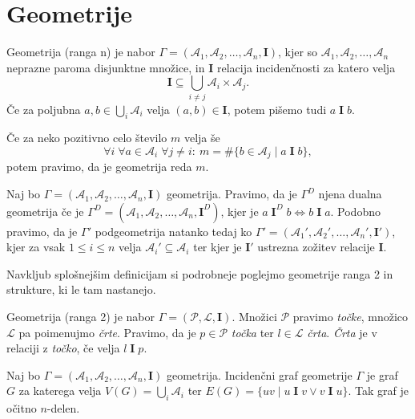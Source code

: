\documentclass[fin1, tisk]{fmfdelo}
\newcommand{\A}{\mathcal{A}}
\newcommand{\II}{\mathbf{I}}
\newcommand{\IIw}[2]{#1 \;\II\; #2}
\newcommand{\IIwd}[2]{#1 \;\II^D\; #2}
\newcommand{\PP}{\mathcal{P}}
\newcommand{\LL}{\mathcal{L}}
\begin{document}
\section{Geometrije}
\begin{definicija}
Geometrija (ranga n) je nabor
$\Gamma = \left(
    \A_1, \A_2, \ldots, \A_n, \II
\right)$, kjer so $\A_1, \A_2, \ldots, \A_n$ neprazne paroma disjunktne 
množice, in $\II$ relacija incidenčnosti za katero velja 
\[\II \subseteq \bigcup_{i\neq j} \A_i \times \A_j.\] Če za poljubna
$a, b \in \bigcup_{i} \A_i$ velja $(a, b) \in \II$, potem pišemo tudi
$\IIw{a}{b}$. 

Če za neko pozitivno celo število $m$ velja še 
\[\forall i \; \forall a \in \A_i\; \forall j \neq i : \ 
m = \#\{b \in \A_j\mid \IIw{a}{b} \},\]
potem pravimo, da je geometrija reda $m$.
\end{definicija}

\begin{definicija}
Naj bo $\Gamma = \left(
    \A_1, \A_2, \ldots, \A_n, \II
\right)$ geometrija. Pravimo, da je $\Gamma^D$ njena dualna geometrija 
če je $\Gamma^D = \left(
    \A_1, \A_2, \ldots, \A_n, \II^D
\right)$, kjer je $\IIwd{a}{b} \Leftrightarrow \IIw{b}{a}$.
\newline 
Podobno pravimo, da je $\Gamma'$ podgeometrija natanko 
tedaj ko $\Gamma' = \left(\A_1', \A_2', \ldots, \A_n', \II'\right)$,
kjer za vsak $1 \leq i \leq n$ velja $\A_i' \subseteq \A_i$ ter kjer 
je $\II'$ ustrezna zožitev relacije $\II$.
\end{definicija}



Navkljub splošnejšim definicijam si podrobneje poglejmo geometrije ranga 2
in strukture, ki le tam nastanejo.

\begin{definicija}
Geometrija (ranga 2) je nabor 
$\Gamma = \left(\PP, \LL, \II\right)$. Množici $\PP$ pravimo \textsl{točke}, 
množico $\LL$ pa poimenujmo \textsl{črte}. Pravimo, da je $p \in \PP$ 
\textsl{točka} ter $l \in \LL$ \textsl{črta}. \newline 
\textsl{Črta} je v relaciji z \textsl{točko}, če velja $\IIw{l}{p}$.
\end{definicija}

\begin{definicija}
Naj bo $\Gamma = \left(
    \A_1, \A_2, \ldots, \A_n, \II
\right)$ geometrija. Incidenčni graf geometrije $\Gamma$ je graf $G$
za katerega velja $V(G) = \bigcup_i \A_i$ ter 
$E(G) = \{uv \mid \IIw{u}{v} \lor \IIw{v}{u}\}$. Tak graf je očitno $n$-delen.
\end{definicija}
\end{document}
